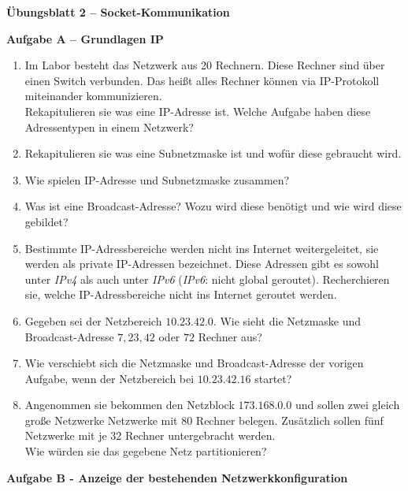 \documentclass[paper=a4,fontsize=11pt]{scrartcl}%
\numberwithin{equation}{section}
\begin{document}
\begin{center}
\Large{\textbf{Übungsblatt 2 -- Socket-Kommunikation}}
\end{center}

\begin{center}\Large{\textbf{Aufgabe A -- Grundlagen IP}}\end{center}\vskip0.25in
\begin{enumerate}
	\item Im Labor besteht das Netzwerk aus 20 Rechnern. Diese Rechner sind über einen Switch verbunden. Das heißt alles Rechner können via IP-Protokoll miteinander kommunizieren.\\
	Rekapitulieren sie was eine IP-Adresse ist. Welche Aufgabe haben diese Adressentypen in einem Netzwerk?
	\item Rekapitulieren sie was eine Subnetzmaske ist und wofür diese gebraucht wird.
	\item Wie spielen IP-Adresse und Subnetzmaske zusammen?
	\item Was ist eine Broadcast-Adresse? Wozu wird diese benötigt und wie wird diese gebildet?
	\item Bestimmte IP-Adressbereiche werden nicht ins Internet weitergeleitet, sie werden als private IP-Adressen bezeichnet. Diese Adressen gibt es sowohl unter \emph{IPv4} als auch unter \emph{IPv6} (\emph{IPv6}: nicht global geroutet). Recherchieren sie, welche IP-Adressbereiche nicht ins Internet geroutet werden.
	\item Gegeben sei der Netzbereich $10.23.42.0$. Wie sieht die Netzmaske und Broadcast-Adresse $7, 23, 42$ oder $72$ Rechner aus? 
	\item Wie verschiebt sich die Netzmaske und Broadcast-Adresse der vorigen Aufgabe, wenn der Netzbereich bei $10.23.42.16$ startet?
	\item Angenommen sie bekommen den Netzblock $173.168.0.0$ und sollen zwei gleich große Netzwerke Netzwerke mit 80 Rechner belegen. Zusätzlich sollen fünf Netzwerke mit je 32 Rechner untergebracht werden.\\
	Wie würden sie das gegebene Netz partitionieren?
\end{enumerate}

\begin{center} \Large{\textbf{Aufgabe B - Anzeige der bestehenden Netzwerkkonfiguration}} \end{center}
\end{document}
